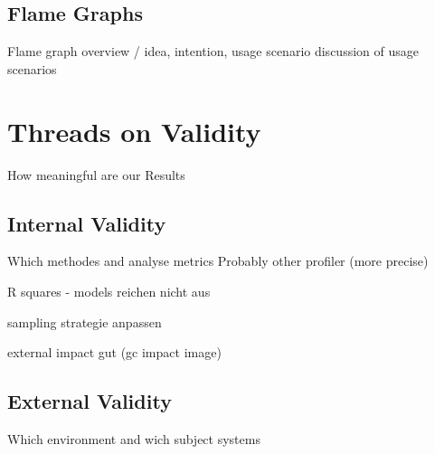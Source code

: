 
\subsection{Flame Graphs}
\label{flame_graph}

Flame graph overview / idea, intention, usage scenario
discussion of usage scenarios




\section{Threads on Validity}
\label{validity}


How meaningful are our Results




\subsection{Internal Validity}

Which methodes and analyse metrics
Probably other profiler (more precise)

R squares - models reichen nicht aus

sampling strategie anpassen

external impact gut (gc impact image)




\subsection{External Validity}

Which environment and wich subject systems


